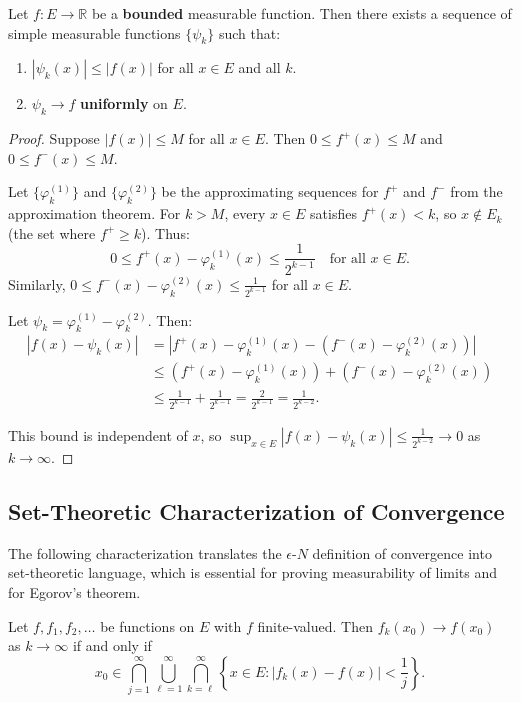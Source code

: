 \documentclass[11pt]{report}
\begin{document}
\begin{thmbox}
Let $f: E \to \mathbb{R}$ be a \textbf{bounded} measurable function. Then there exists a sequence of simple measurable functions $\{\psi_k\}$ such that:
\begin{enumerate}
    \item $|\psi_k(x)| \leq |f(x)|$ for all $x \in E$ and all $k$.
    \item $\psi_k \to f$ \textbf{uniformly} on $E$.
\end{enumerate}
\end{thmbox}

\begin{proof}
Suppose $|f(x)| \leq M$ for all $x \in E$. Then $0 \leq f^+(x) \leq M$ and $0 \leq f^-(x) \leq M$.

Let $\{\varphi_k^{(1)}\}$ and $\{\varphi_k^{(2)}\}$ be the approximating sequences for $f^+$ and $f^-$ from the approximation theorem. For $k > M$, every $x \in E$ satisfies $f^+(x) < k$, so $x \notin E_k$ (the set where $f^+ \geq k$). Thus:
\[
0 \leq f^+(x) - \varphi_k^{(1)}(x) \leq \frac{1}{2^{k-1}} \quad \text{for all } x \in E.
\]
Similarly, $0 \leq f^-(x) - \varphi_k^{(2)}(x) \leq \frac{1}{2^{k-1}}$ for all $x \in E$.

Let $\psi_k = \varphi_k^{(1)} - \varphi_k^{(2)}$. Then:
\begin{align*}
|f(x) - \psi_k(x)| &= |f^+(x) - \varphi_k^{(1)}(x) - (f^-(x) - \varphi_k^{(2)}(x))| \\
&\leq (f^+(x) - \varphi_k^{(1)}(x)) + (f^-(x) - \varphi_k^{(2)}(x)) \\
&\leq \frac{1}{2^{k-1}} + \frac{1}{2^{k-1}} = \frac{2}{2^{k-1}} = \frac{1}{2^{k-2}}.
\end{align*}

This bound is independent of $x$, so $\sup_{x \in E} |f(x) - \psi_k(x)| \leq \frac{1}{2^{k-2}} \to 0$ as $k \to \infty$.
\end{proof}

\subsection{Set-Theoretic Characterization of Convergence}

The following characterization translates the $\epsilon$-$N$ definition of convergence into set-theoretic language, which is essential for proving measurability of limits and for Egorov's theorem.

\begin{propbox}
Let $f, f_1, f_2, \ldots$ be functions on $E$ with $f$ finite-valued. Then $f_k(x_0) \to f(x_0)$ as $k \to \infty$ if and only if
\[
x_0 \in \bigcap_{j=1}^{\infty} \bigcup_{\ell=1}^{\infty} \bigcap_{k=\ell}^{\infty} \left\{ x \in E : |f_k(x) - f(x)| < \frac{1}{j} \right\}.
\]
\end{propbox}
\end{document}
